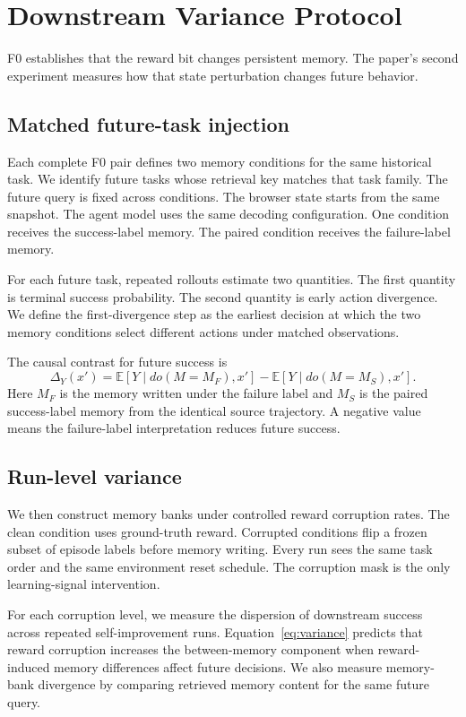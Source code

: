 \section{Downstream Variance Protocol}
\label{sec:variance}
F0 establishes that the reward bit changes persistent memory. The paper's second experiment measures how that state perturbation changes future behavior.

\subsection{Matched future-task injection}
Each complete F0 pair defines two memory conditions for the same historical task. We identify future tasks whose retrieval key matches that task family. The future query is fixed across conditions. The browser state starts from the same snapshot. The agent model uses the same decoding configuration. One condition receives the success-label memory. The paired condition receives the failure-label memory.

For each future task, repeated rollouts estimate two quantities. The first quantity is terminal success probability. The second quantity is early action divergence. We define the first-divergence step as the earliest decision at which the two memory conditions select different actions under matched observations.

The causal contrast for future success is
\begin{equation}
\Delta_Y(x')=
\mathbb{E}[Y\mid do(M=M_F),x']-
\mathbb{E}[Y\mid do(M=M_S),x'].
\end{equation}
Here $M_F$ is the memory written under the failure label and $M_S$ is the paired success-label memory from the identical source trajectory. A negative value means the failure-label interpretation reduces future success.

\subsection{Run-level variance}
We then construct memory banks under controlled reward corruption rates. The clean condition uses ground-truth reward. Corrupted conditions flip a frozen subset of episode labels before memory writing. Every run sees the same task order and the same environment reset schedule. The corruption mask is the only learning-signal intervention.

For each corruption level, we measure the dispersion of downstream success across repeated self-improvement runs. Equation~\ref{eq:variance} predicts that reward corruption increases the between-memory component when reward-induced memory differences affect future decisions. We also measure memory-bank divergence by comparing retrieved memory content for the same future query.


